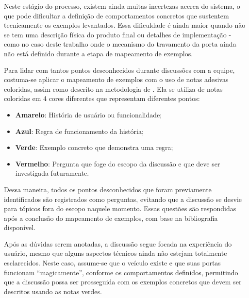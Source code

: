 Neste estágio do processo, existem ainda muitas incertezas acerca do sistema, o que pode dificultar a definição de comportamentos concretos que sustentem 
tecnicamente os exemplos levantados. Essa dificuldade é ainda maior quando não se tem uma descrição física do produto final ou detalhes de implementação - como no 
caso deste trabalho onde o mecanismo do travamento da porta ainda não está definido durante a etapa de mapeamento de exemplos.

Para lidar com tantos pontos desconhecidos durante discussões com a equipe, costuma-se aplicar o mapeamento de exemplos com o uso de notas adesivas coloridas, 
assim como descrito na metodologia de . Ela se utiliza de notas coloridas em 4 cores diferentes que representam diferentes pontos:

\begin{itemize}
	\item \textbf{Amarelo}: História de usuário ou funcionalidade;
	\item \textbf{Azul}: Regra de funcionamento da história;
	\item \textbf{Verde}: Exemplo concreto que demonstra uma regra;
	\item \textbf{Vermelho}: Pergunta que foge do escopo da discussão e que deve ser investigada futuramente.
\end{itemize}

Dessa maneira, todos os pontos desconhecidos que foram previamente identificados são registrados como perguntas, evitando que a discussão se desvie para tópicos 
fora do escopo naquele momento. Essas questões são respondidas após a conclusão do mapeamento de exemplos, com base na bibliografia disponível.

Após as dúvidas serem anotadas, a discussão segue focada na experiência do usuário, mesmo que alguns aspectos técnicos ainda não estejam totalmente esclarecidos. 
Neste caso, assume-se que o veículo existe e que suas portas funcionam ``magicamente'', conforme os comportamentos definidos, permitindo que a discussão possa ser 
prosseguida com os exemplos concretos que devem ser descritos usando as notas verdes.




